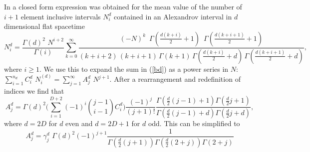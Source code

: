 \documentclass[12pt]{article}
\begin{document}
{In \cite{Glaser_Sumati:Locality_in_Causal_Set} a closed form expression was obtained for the mean value of the number of $i+1$ element inclusive intervals $N_i^d$ contained in an Alexandrov interval in $d$ dimensional flat spacetime 
\begin{equation} N_i^d= \frac{\Gamma(d)^2\, \, N^{i+2}}{\Gamma(i)} \sum_{k=0}^\infty \frac{(-N)^k \, \, \, \Gamma(\frac{d(k+i)}{2}+1) \, \, \,  \Gamma(\frac{d(k+i+1)}{2}+1)}{(k+i+2) \, (k+i+1)\, \Gamma(k+1)\, \Gamma(\frac{d(k+i)}{2} +d) \,\Gamma(\frac{d(k+i+1)}{2}+d)}, 
\end{equation} 
where $i \geq 1$.  We use this to expand the sum in (\ref{bd}) as a power series in $N$: $\sum_{i=1}^{n_d} C_i^d \, \, N_i^{(d)} = \sum_{j=1}^\infty A_j^d \, \, N^{j+1}$.  After a rearrangement and redefinition of indices we find that 
\begin{equation}
 A_j^d = \Gamma(d)^2\biggl( \sum_{i=1}^{D+2} (-1)^i \binom{j-1}{i-1}  C_i^d  \biggr) \frac{(-1)^j}{(j+1)!}\frac{\Gamma(\frac{d}{2}(j-1)+1)\Gamma(\frac{d}{2}j+1)}{\Gamma(\frac{d}{2}(j-1)+d) \Gamma(\frac{d}{2}j+d)}, 
\end{equation} 
where $d=2D$ for $d$ even and $d=2D+1$ for $d$ odd.   
This can be simplified to 
\begin{equation}
A_j^d= \gamma_j^d \, \, \Gamma(d)^2 (-1)^{j+1} \frac{1}{\Gamma(\frac{d}{2} (j + 1)) \Gamma(\frac{d}{2} (2 + j)) \Gamma(2 + j) }

\end{equation}}
\end{document}
